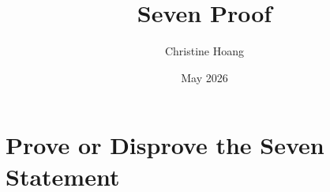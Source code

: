 \documentclass{article}
\title{Seven Proof}
\author{Christine Hoang}
\date{May 2026}
\begin{document}
\maketitle

\section{Prove or Disprove the Seven Statement}
\end{document}
